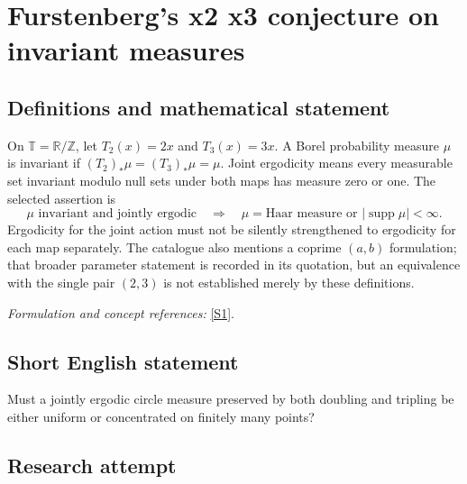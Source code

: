 \documentclass[11pt,a4paper]{article}
\newcommand{\Z}{\mathbb{Z}}
\newcommand{\R}{\mathbb{R}}
\newcommand{\sref}[2]{\hyperlink{source:#1:#2}{[S#2]}}
\newif\ifshowcatalogue
\newcommand{\cataloguescope}[1]{\ifshowcatalogue
 \paragraph{Exact scope in the supplied catalogue.}
 \begin{quote}\small #1\end{quote}\fi}
\numberwithin{equation}{section}
\begin{document}
\setcounter{section}{0}
\clearpage
\section*{\texorpdfstring{Furstenberg's x2 x3 conjecture on invariant measures}{Furstenberg's x2 x3 conjecture on invariant measures}}\label{30006777}
\subsection{Definitions and mathematical statement}
On $\mathbb T=\R/\Z$, let $T_2(x)=2x$ and $T_3(x)=3x$. A Borel probability measure $\mu$ is invariant if $(T_2)_*\mu=(T_3)_*\mu=\mu$. Joint ergodicity means every measurable set invariant modulo null sets under both maps has measure zero or one. The selected assertion is
\[
 \mu\text{ invariant and jointly ergodic}
 \quad\Longrightarrow\quad
 \mu=\text{Haar measure or }|\operatorname{supp}\mu|<\infty.
\]
Ergodicity for the joint action must not be silently strengthened to ergodicity for each map separately. The catalogue also mentions a coprime $(a,b)$ formulation; that broader parameter statement is recorded in its quotation, but an equivalence with the single pair $(2,3)$ is not established merely by these definitions.
\par\smallskip\textit{Formulation and concept references:} \sref{30006777}{1}.
\cataloguescope{Prove that every ergodic probability measure on the unit circle T that is invariant under both maps x -> 2x mod 1 and x -> 3x mod 1 is either the Lebesgue measure or supported on a finite set (equivalently, for coprime a,b >= 2, every ergodic x(a,b)-invariant measure is Lebesgue or finitely supported).}
\subsection{Short English statement}
Must a jointly ergodic circle measure preserved by both doubling and tripling be either uniform or concentrated on finitely many points?
\subsection{Research attempt}
\end{document}
